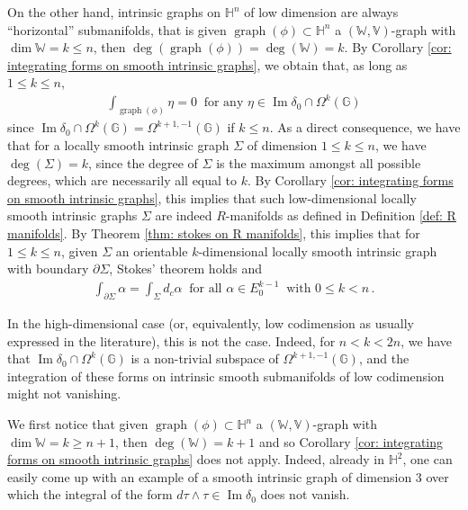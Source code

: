 \documentclass[dvipsnames]{amsart}
\theoremstyle{definition}
\theoremstyle{definition}
\numberwithin{equation}{section}
\newcommand{\W}{\mathbb{W}}
\newcommand{\V}{\mathbb{V}}
\newcommand{\G}{\mathbb{G}}
\renewcommand{\H}{\mathbb{H}}
\begin{document}
    On the other hand, intrinsic graphs on $\mathbb H^n$ of low dimension are always ``horizontal'' submanifolds, that is given $\operatorname{graph}(\phi)\subset\H^n$ a $(\W,\V)$-graph with $\operatorname{dim}\W=k\le n$, then $\operatorname{deg}(\operatorname{graph}(\phi))=\deg(\W)=k$. By Corollary \ref{cor: integrating forms on smooth intrinsic graphs}, we obtain that, as long as $1\le k\le n$,
    \begin{align*}
        \int_{\operatorname{graph}(\phi)}\eta=0\ \text{ for any }\eta\in\operatorname{Im}\delta_0\cap\Omega^{k}(\G)
    \end{align*}
    since $\operatorname{Im}\delta_0\cap\Omega^k(\G)=\Omega^{k+1,-1}(\G)$ if $k\le n$.
    As a direct consequence, we have that for a locally smooth intrinsic graph $\Sigma$ of dimension $1\le k\le n$, we have $\operatorname{deg}(\Sigma)=k$, since the degree of $\Sigma$ is the maximum amongst all possible degrees, which are necessarily all equal to $k$. By Corollary \ref{cor: integrating forms on smooth intrinsic graphs}, this implies that such low-dimensional locally smooth intrinsic graphs $\Sigma$ are indeed $R$-manifolds as defined in Definition \ref{def: R manifolds}. By Theorem \ref{thm: stokes on R manifolds}, this implies that for $1\le k\le n$, given $\Sigma$ an orientable $k$-dimensional locally smooth intrinsic graph with boundary $\partial\Sigma$, Stokes' theorem holds and
    \begin{align*}
        \int_{\partial\Sigma}\alpha=\int_\Sigma d_c\alpha\ \text{ for all }\alpha\in E_0^{k-1}\ \text{ with }0\le k<n\,.
    \end{align*}

    In the high-dimensional case (or, equivalently, low codimension as usually expressed in the literature), this is not the case. Indeed, for $n<k<2n$, we have that $\operatorname{Im}\delta_0\cap\Omega^k(\G)$ is a non-trivial subspace of $\Omega^{k+1,-1}(\G)$, and the integration of these forms on intrinsic smooth submanifolds of low codimension might not vanishing.
    
    We first notice that given $\operatorname{graph}(\phi)\subset\H^n$ a $(\W,\V)$-graph with $\operatorname{dim}\W=k\ge n+1$, then $\operatorname{deg}(\W)=k+1$ and so Corollary \ref{cor: integrating forms on smooth intrinsic graphs} does not apply. Indeed, already in $\H^2$, one can easily come up with an example of a smooth intrinsic graph of dimension $3$ over which the integral of the form $d\tau\wedge\tau\in\operatorname{Im}\delta_0$ does not vanish. 
\end{document}
